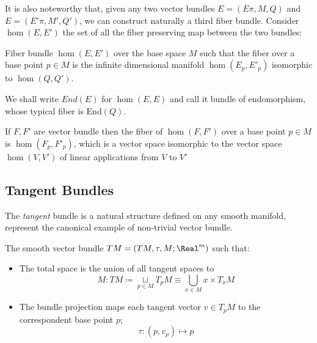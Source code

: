 \documentclass[Main]{subfiles}
\begin{document}
			
			It is also noteworthy that, given any two vector bundles $E =(E\pi,M,Q)$ and $E =(E'\pi,M',Q')$, we can construct 	naturally a third fiber bundle.
			Consider $\hom(E,E')$ the set of all the fiber preserving map between the two bundles:
			\begin{definition}
				Fiber bundle $\hom(E,E')$ over the base space $M$ such that the fiber over a base point $p\in M$ is the infinite dimensional manifold $\hom(E_p,E'_p)$ isomorphic to $\hom(Q,Q')$.
			\end{definition}
			\begin{notationfix}
				We shall write $End(E)$ for $\hom(E,E)$ and call it bundle of endomorphism, whose typical fiber is $\textrm{End}(Q)$.
			\end{notationfix}
			\begin{remark}
				If $F,F'$ are vector bundle then the fiber of  $\hom(F,F')$ over a base point $p\in M$ is $\hom(F_p,F'_p)$, which is a vector space isomorphic to the vector space $\hom(V,V')$ of linear applications from $V$ to $V'$
			\end{remark}
	
		\subsection{Tangent Bundles}
			The \emph{tangent} bundle is a natural structure defined on any smooth manifold, represent the canonical example of  non-trivial vector bundle.
						
			\begin{definition}
				The smooth vector bundle $TM=(TM,\tau,M;\Real^m)$ such that:
				\begin{itemize}
					\item The total space is the union of all tangent spaces to 
						$$M: TM \coloneqq \underset{p \in M}{\sqcup} T_pM  \equiv \bigcup_{x\in M} {x}\times T_x M$$
					\item The bundle projection maps each tangent vector $v\in  T_pM$ to the correspondent base point  $p$;
						$$\tau : (p,v_p) \mapsto p $$
				\end{itemize}
			\end{definition}			
			
\end{document}
